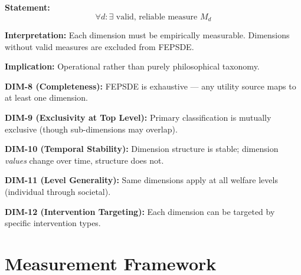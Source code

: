 \begin{tcolorbox}[colback=gray!5!white, colframe=gray!75!black,
    title=Axiom DIM-7: Measurability]
\textbf{Statement:}
\begin{equation}
\forall d: \exists \text{ valid, reliable measure } M_d
\end{equation}

\textbf{Interpretation:} Each dimension must be empirically measurable.
Dimensions without valid measures are excluded from FEPSDE.

\textbf{Implication:} Operational rather than purely philosophical taxonomy.
\end{tcolorbox}

\begin{tcolorbox}[colback=gray!5!white, colframe=gray!75!black,
    title=Axioms DIM-8 to DIM-12: Structural Properties]

\textbf{DIM-8 (Completeness):} FEPSDE is exhaustive --- any utility source
maps to at least one dimension.

\textbf{DIM-9 (Exclusivity at Top Level):} Primary classification is mutually
exclusive (though sub-dimensions may overlap).

\textbf{DIM-10 (Temporal Stability):} Dimension structure is stable;
dimension \textit{values} change over time, structure does not.

\textbf{DIM-11 (Level Generality):} Same dimensions apply at all welfare levels
(individual through societal).

\textbf{DIM-12 (Intervention Targeting):} Each dimension can be targeted by
specific intervention types.
\end{tcolorbox}


\section{Measurement Framework}
\label{sec:what-measurement}

